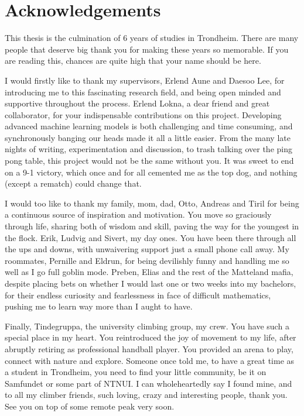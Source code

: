 \documentclass[../../thesis.tex]{subfiles}
\begin{document}

\section{Acknowledgements}
This thesis is the culmination of 6 years of studies in Trondheim. There are many people that deserve big thank you for making these years so memorable. If you are reading this, chances are quite high that your name should be here.\newline 

I would firstly like to thank my supervisors, Erlend Aune and Daesoo Lee, for introducing me to this fascinating research field, and being open minded and supportive throughout the process. Erlend Lokna, a dear friend and great collaborator, for your indispensable contributions on this project. Developing advanced machine learning models is both challenging and time consuming, and synchronously banging our heads made it all a little easier. From the many late nights of writing, experimentation and discussion, to trash talking over the ping pong table, this project would not be the same without you. It was sweet to end on a 9-1 victory, which once and for all cemented me as the top dog, and nothing (except a rematch) could change that.\newline

I would too like to thank my family, mom, dad, Otto, Andreas and Tiril for being a continuous source of inspiration and motivation. You move so graciously through life, sharing both of wisdom and skill, paving the way for the youngest in the flock. Erik, Ludvig and Sivert, my day ones. You have been there through all the ups and downs, with unwaivering support just a small phone call away. My roommates, Pernille and Eldrun, for being devilishly funny and handling me so well as I go full goblin mode. Preben, Elias and the rest of the Matteland mafia, despite placing bets on whether I would last one or two weeks into my bachelors, for their endless curiosity and fearlessness in face of difficult mathematics, pushing me to learn way more than I aught to have. \newline

Finally, Tindegruppa, the university climbing group, my crew. You have such a special place in my heart. You reintroduced the joy of movement to my life, after abruptly retiring as professional handball player. You provided an arena to play, connect with nature and explore. Someone once told me, to have a great time as a student in Trondheim, you need to find your little community, be it on Samfundet or some part of NTNUI. I can wholeheartedly say I found mine, and to all my climber friends, such loving, crazy and interesting people, thank you. See you on top of some remote peak very soon.
\end{document}

